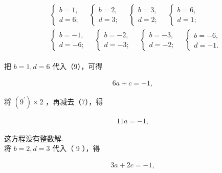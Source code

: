 \documentclass[10pt]{article}
\begin{document}
\begin{align*}
\begin{aligned}
& \left\{\begin{array} { l } 
{ b = 1 , } \\
{ d = 6 ; }
\end{array} \quad \left\{\begin{array} { l } 
{ b = 2 , } \\
{ d = 3 ; }
\end{array} \quad \left\{\begin{array} { l } 
{ b = 3 , } \\
{ d = 2 ; }
\end{array} \quad \left\{\begin{array}{l}
b=6, \\
d=1 ;
\end{array}\right.\right.\right.\right. \\
& \left\{\begin{array} { l } 
{ b = - 1 , } \\
{ d = - 6 ; }
\end{array} \quad \left\{\begin{array} { l } 
{ b = - 2 , } \\
{ d = - 3 ; }
\end{array} \quad \left\{\begin{array} { l } 
{ b = - 3 , } \\
{ d = - 2 ; }
\end{array} \quad \left\{\begin{array}{l}
b=-6, \\
d=-1 .
\end{array}\right.\right.\right.\right.
\end{aligned}
\end{align*}

把 $b=1, d=6$ 代入（9），可得

\begin{align*}
6 a+c=-1,
\end{align*}

将 $\left(9^{\prime}\right) \times 2$ ，再减去（7），得

\begin{align*}
11 a=-1,
\end{align*}

这方程没有整数解.\\
将 $b=2, d=3$ 代入（ 9 ），得

\begin{align*}
3 a+2 c=-1,
\end{align*}
\end{document}
